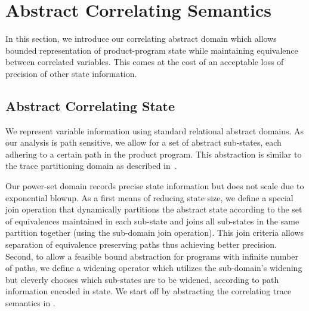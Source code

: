 \section{Abstract Correlating Semantics}

In this section, we introduce our correlating abstract domain which allows bounded representation of product-program state while maintaining equivalence between correlated variables. This comes at the cost of an acceptable loss of precision of other state information.

\subsection{Abstract Correlating State}

We represent variable information using standard relational abstract domains. As our analysis is path sensitive, we allow for a set of abstract sub-states, each adhering to a certain path in the product program. This abstraction is similar to the trace partitioning domain as described in~\cite{MauborgneRival07}.

Our power-set domain records precise state information but does not scale due to exponential blowup. As a first means of reducing state size, we define a special join operation that dynamically partitions the abstract state according to the set of equivalences maintained in each sub-state and joins all sub-states in the same partition together (using the sub-domain join operation). This join criteria allows separation of equivalence preserving paths thus achieving better precision. Second, to allow a feasible bound abstraction for programs with infinite number of paths, we define a widening operator which utilizes the sub-domain's widening but cleverly chooses which sub-states are to be widened, according to path information encoded in state.
We start off by abstracting the correlating trace semantics in .

